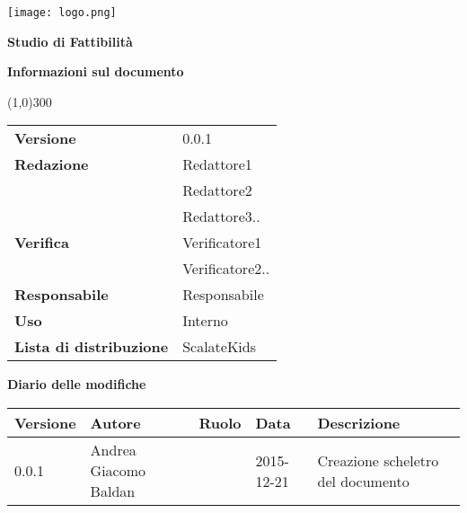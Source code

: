 \documentclass{scalatekids-article}
\begin{document}
\begin{titlepage}
  \centering
  \texttt{[image: logo.png]}\par\vspace{1cm}
  \vspace{1.5cm}
         {\Huge\bfseries Studio di Fattibilità \par}
         \begin{center}
           \vspace{1.0cm}
                  {\large\bfseries Informazioni sul documento \par}
         \end{center}
         \vspace{-1cm}
         \begin{center}
           \line(1,0){300}
         \end{center}
         \vspace{0cm}
         \begin{tabular}[c]{l|l}
           \textbf{Versione} & 0.0.1\\
           \textbf{Redazione} & Redattore1\\ & Redattore2\\ & Redattore3..\\
           \textbf{Verifica} & Verificatore1\\ & Verificatore2..\\
           \textbf{Responsabile} & Responsabile\\
           \textbf{Uso} & Interno\\
           \textbf{Lista di distribuzione} & ScalateKids
         \end{tabular}
\end{titlepage}
\clearpage
\setcounter{page}{1}
\begin{flushleft}
  \vspace{0cm}
         {\large\bfseries Diario delle modifiche \par}
\end{flushleft}
\vspace{0cm}
\begin{center}
  \begin{tabular}{|l | l | l | l | l |}
    \hline
    Versione & Autore & Ruolo & Data & Descrizione \\
    \hline
    0.0.1 & Andrea Giacomo Baldan & & 2015-12-21 & Creazione scheletro del documento\\
    \hline
  \end{tabular}
\end{center}
\tableofcontents
\end{document}
